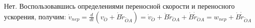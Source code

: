 Нет. Воспользовавшись определениями переносной скорости и переносного
ускорения, получим:
$\dot{v}_{nep}=\frac{d}{dt}\left(v_{\breve{O}}+\dot{B}
\tilde{r}_{\tilde{O}A}\right)=
\dot{v}_{\breve{O}}+\ddot{B}\tilde{r}_{\breve{O}A}+\dot{B}
\dot{\tilde{r}}_{\breve{O}A}=w_{nep}+\dot{B}
\dot{\tilde{r}}_{\tilde{O}A}$
